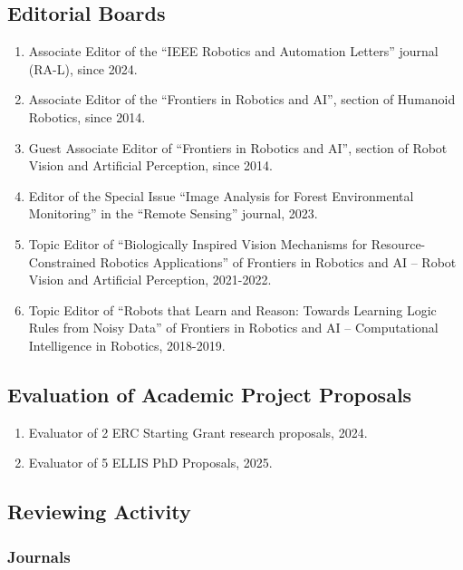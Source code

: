 \subsection{Editorial Boards}\label{editorial-boards}

\begin{enumerate}
\def\labelenumi{\arabic{enumi}.}
\item
  Associate Editor of the ``IEEE Robotics and Automation Letters''
  journal (RA-L), since 2024.
\item
  Associate Editor of the ``Frontiers in Robotics and AI'', section of
  Humanoid Robotics, since 2014.
\item
  Guest Associate Editor of ``Frontiers in Robotics and AI'', section of
  Robot Vision and Artificial Perception, since 2014.
\item
  Editor of the Special Issue ``Image Analysis for Forest Environmental
  Monitoring'' in the ``Remote Sensing'' journal, 2023.
\item
  Topic Editor of ``Biologically Inspired Vision Mechanisms for
  Resource-Constrained Robotics Applications'' of Frontiers in Robotics
  and AI -- Robot Vision and Artificial Perception, 2021-2022.
\item
  Topic Editor of ``Robots that Learn and Reason: Towards Learning Logic
  Rules from Noisy Data'' of Frontiers in Robotics and AI --
  Computational Intelligence in Robotics, 2018-2019.
\end{enumerate}

\subsection{Evaluation of Academic Project
Proposals}\label{evaluation-of-academic-project-proposals}

\begin{enumerate}
\def\labelenumi{\arabic{enumi}.}
\item
  Evaluator of 2 ERC Starting Grant research proposals, 2024.
\item
  Evaluator of 5 ELLIS PhD Proposals, 2025.
\end{enumerate}

\subsection{Reviewing Activity}\label{reviewing-activity}

\subsubsection{Journals}\label{journals}

